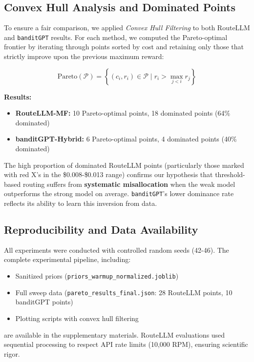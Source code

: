\subsection{Convex Hull Analysis and Dominated Points}

To ensure a fair comparison, we applied \textit{Convex Hull Filtering} to both RouteLLM and \texttt{banditGPT} results. For each method, we computed the Pareto-optimal frontier by iterating through points sorted by cost and retaining only those that strictly improve upon the previous maximum reward:

\begin{equation}
\text{Pareto}(\mathcal{P}) = \left\{ (c_i, r_i) \in \mathcal{P} \mid r_i > \max_{j < i} r_j \right\}
\end{equation}

\textbf{Results:}
\begin{itemize}
    \item \textbf{RouteLLM-MF:} 10 Pareto-optimal points, 18 dominated points (64\% dominated)
    \item \textbf{banditGPT-Hybrid:} 6 Pareto-optimal points, 4 dominated points (40\% dominated)
\end{itemize}

The high proportion of dominated RouteLLM points (particularly those marked with red X's in the \$0.008{-}\$0.013 range) confirms our hypothesis that threshold-based routing suffers from \textbf{systematic misallocation} when the weak model outperforms the strong model on average. \texttt{banditGPT}'s lower dominance rate reflects its ability to learn this inversion from data.

\subsection{Reproducibility and Data Availability}

All experiments were conducted with controlled random seeds (42{-}46). The complete experimental pipeline, including:
\begin{itemize}
    \item Sanitized priors (\texttt{priors\_warmup\_normalized.joblib})
    \item Full sweep data (\texttt{pareto\_results\_final.json}: 28 RouteLLM points, 10 banditGPT points)
    \item Plotting scripts with convex hull filtering
\end{itemize}
are available in the supplementary materials. RouteLLM evaluations used sequential processing to respect API rate limits (10,000 RPM), ensuring scientific rigor.

% 
% 

